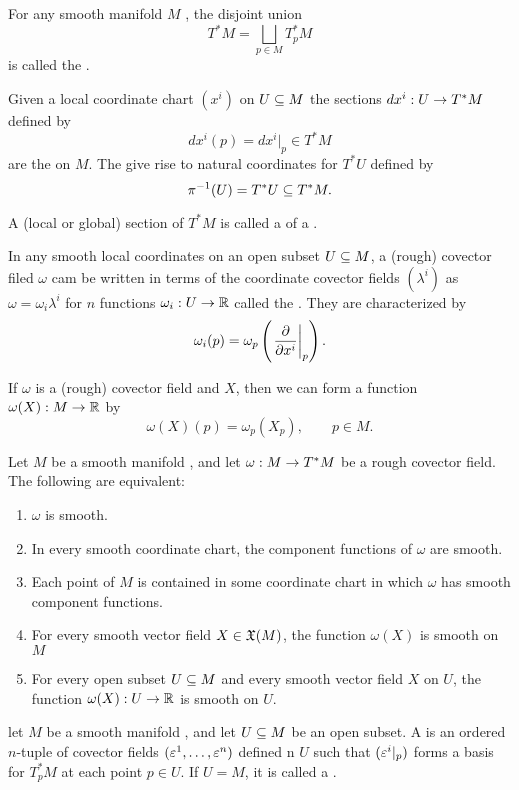 \dfn For any smooth manifold $M$ \wowob, the disjoint union
\[T^*M = \bigsqcup_{p\in M} T^*_pM\]
is called the .

\dfn Given a local coordinate chart $(x^i)$ on $U\subseteq M$ the sections $dx^i:U\rightarrow T^*M$ defined by
\[dx^i(p) = dx^i|_p\in T^*M\]
are the  on $M$. The give rise to natural coordinates for $T^*U$ defined by
\[\pi^{-1}(U) = T^*U\subseteq T^*M.\]

\dfn A (local or global) section of $T^*M$ is called a  of a .

\dfn In any smooth local coordinates on an open subset $U\subseteq M$, a (rough) covector filed $\omega$ cam be written in terms of the coordinate covector fields $(\lambda^i)$ as $\omega = \omega_i\lambda^i$ for $n$ functions $\omega_i:U\rightarrow \mathbb{R}$ called the . They are characterized by
\[\omega_i(p) = \omega_p\left(\left. \frac{\partial}{\partial x^i}\right|_{p}\right).\]

\nb If $\omega$ is a (rough) covector field and $X$, then we can form a function $\omega(X):M\rightarrow \mathbb{R}$ by
\[\omega(X)(p) = \omega_p(X_p),\qquad p\in M.\]

\begin{prop}
Let $M$ be a smooth manifold \wowob, and let $\omega:M\rightarrow T^*M$ be a rough covector field. The following are equivalent:
\begin{enumerate}
    \item $\omega$ is smooth.
    \item In every smooth coordinate chart, the component functions of $\omega$ are smooth.
    \item Each point of $M$ is contained in some coordinate chart in which $\omega$ has smooth component functions.
    \item For every smooth vector field $X\in \mathfrak{X}(M)$, the function $\omega(X)$ is smooth on $M$
    \item For every open subset $U\subseteq M$ and every smooth vector field $X$ on $U$, the function $\omega(X):U\rightarrow \mathbb{R}$ is smooth on $U$.
\end{enumerate}
\end{prop}

\dfn let $M$ be a smooth manifold \wowob, and let $U\subseteq M$ be an open subset. A  is an ordered $n$-tuple of covector fields $(\varepsilon^1,\ldots,\varepsilon^n)$ defined n $U$ such that $(\varepsilon^i|_p)$ forms a basis for $T^*_pM$ at each point $p\in U$. If $U = M$, it is called a .

